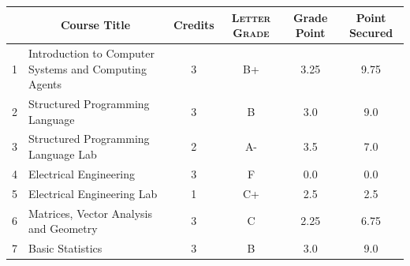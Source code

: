 \documentclass[11pt]{article}
\newcommand*{\numtwo}[1]{\pgfmathprintnumber[
                    fixed, precision=2, fixed zerofill=true]{#1}}
\begin{document}
                \begin{center}
                    \renewcommand{\arraystretch}{1.08}
                    
                \begin{tabular}{|c|l|c|>{\scshape}c|c|c|}
                \hline  \rule[-1ex]{0pt}{3.5ex} {\centering{\bf Course Code}} &  \multicolumn{1}{c|}{\textbf{Course Title}}  & {\bf Credits} & {\bf Letter Grade} & {\bf Grade Point} & {\bf Point Secured}  \\ 
                \hline   1 &  Introduction to Computer Systems and Computing Agents		 & 3 & B+ & 3.25 & 9.75 \\ %
                \hline   2 &  Structured Programming Language		 & 3 & B & 3.0 & 9.0 \\ %
                \hline   3 &  Structured Programming Language Lab		 & 2 & A- & 3.5 & 7.0 \\ %
                \hline   4 &  Electrical Engineering		 & 3 & F & 0.0 & 0.0 \\ %
                \hline   5 &  Electrical Engineering Lab		 & 1 & C+ & 2.5 & 2.5 \\ %
                \hline   6 &  Matrices, Vector Analysis and Geometry		 & 3 & C & 2.25 & 6.75 \\ %
                \hline   7 &  Basic Statistics		 & 3 & B & 3.0 & 9.0 \\ %

\hline                %
                \end{tabular}
                \end{center}
                \renewcommand{\arraystretch}{1.03}
\end{document}
